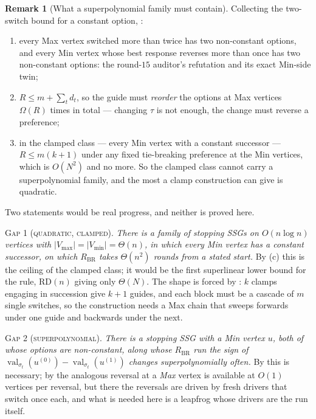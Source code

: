 \documentclass[11pt]{article}
\theoremstyle{plain}
\theoremstyle{definition}
\newtheorem{remark}[theorem]{Remark}
\DeclareMathOperator{\val}{val}
\newcommand{\Vmax}{V_{\max}}
\newcommand{\Vmin}{V_{\min}}
\begin{document}
\begin{remark}[What a superpolynomial family must contain]\label{rem:rbr-programme}
Collecting the two-switch bound for a constant option, :
\begin{enumerate}
\item[(a)] every Max vertex switched more than twice has two non-constant
 options, and every Min vertex whose best response reverses more than once has
 two non-constant options: the round-$15$ auditor's refutation and its exact
 Min-side twin;
\item[(b)] $R\le m+\sum_td_t$, so the guide must \emph{reorder} the options at
 Max vertices $\Omega(R)$ times in total --- changing $\tau$ is not enough,
 the change must reverse a preference;
\item[(c)] in the clamped class --- every Min vertex with a constant successor
 --- $R\le m(k+1)$ under any fixed tie-breaking preference at the Min
 vertices, which is $O(N^{2})$ and no more.  So the clamped class
 cannot carry a superpolynomial family, and the most a clamp construction can
 give is quadratic.
\end{enumerate}
Two statements would be real progress, and neither is proved here.

\medskip\noindent\textsc{Gap 1 (quadratic, clamped).} \emph{There is a family
of stopping SSGs on $O(n\log n)$ vertices with $|\Vmax|=|\Vmin|=\Theta(n)$, in
which every Min vertex has a constant successor, on which $R_{\mathrm{BR}}$
takes $\Theta(n^{2})$ rounds from a stated start.}  By (c) this is the
ceiling of the clamped class; it would be the first superlinear lower bound
for the rule, $\mathrm{RD}(n)$ giving only $\Theta(N)$.  The shape is forced
by : $k$ clamps engaging in succession give $k+1$ guides,
and each block must be a cascade of $m$ single switches, so the construction
needs a Max chain that sweeps forwards under one guide and backwards under the
next.

\medskip\noindent\textsc{Gap 2 (superpolynomial).} \emph{There is a stopping
SSG with a Min vertex $u$, both of whose options are non-constant, along whose
$R_{\mathrm{BR}}$ run the sign of
$\val_{\sigma_t}(u^{(0)})-\val_{\sigma_t}(u^{(1)})$ changes superpolynomially
often.}  By  this is necessary; by  the
analogous reversal at a \emph{Max} vertex is available at $O(1)$ vertices per
reversal, but there the reversals are driven by fresh drivers that switch once
each, and what is needed here is a leapfrog whose drivers are the run itself.
\end{remark}
\end{document}
